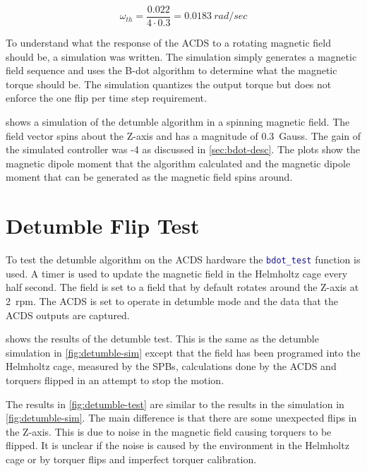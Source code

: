 \begin{equation}
    \omega _ {th} =  \frac{0.022}{4 \cdot 0.3} = 0.0183 ~ \unit{rad / sec}
    \label{eq:omega-th-calc}
\end{equation}

To understand what the response of the \ac{ACDS} to a rotating magnetic field should be, a simulation was written. The simulation simply generates a magnetic field sequence and uses the B-dot algorithm to determine what the magnetic torque should be. The simulation quantizes the output torque but does not enforce the one flip per time step requirement.


 shows a simulation of the detumble algorithm in a spinning magnetic field. The field vector spins about the Z-axis and has a magnitude of 0.3~Gauss. The gain of the simulated controller was -4 as discussed in \cref{sec:bdot-desc}. The plots show the magnetic dipole moment that the algorithm calculated and the magnetic dipole moment that can be generated as the magnetic field spins around.


\section{Detumble Flip Test}

To test the detumble algorithm on the \ac{ACDS} hardware the \lstinline[style=code,language=Matlab]$bdot_test$ function is used. A timer is used to update the magnetic field in the Helmholtz cage every half second. The field is set to a field that by default rotates around the Z-axis at 2~rpm. The \ac{ACDS} is set to operate in detumble mode and the data that the \ac{ACDS} outputs are captured.


 shows the results of the detumble test. This is the same as the detumble simulation in \cref{fig:detumble-sim} except that the field has been programed into the Helmholtz cage, measured by the \acp{SPB}, calculations done by the \ac{ACDS} and torquers flipped in an attempt to stop the motion.

The results in \cref{fig:detumble-test} are similar to the results in the simulation in \cref{fig:detumble-sim}. The main difference is that there are some unexpected flips in the Z-axis. This is due to noise in the magnetic field causing torquers to be flipped. It is unclear if the noise is caused by the environment in the Helmholtz cage or by torquer flips and imperfect torquer calibration.


